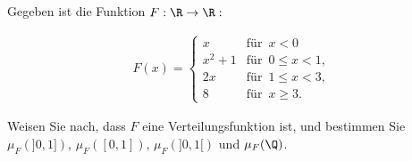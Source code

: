 \begin{exercise}

Gegeben ist die Funktion $F: \R \to \R:$

\begin{align*}
  F(x) =
  \begin{cases}
    x       & \text{für} \enspace x < 0 \\
    x^2 + 1 & \text{für} \enspace 0 \leq x < 1, \\
    2x      & \text{für} \enspace 1 \leq x < 3, \\
    8       & \text{für} \enspace x \geq 3.
  \end{cases}
\end{align*}

Weisen Sie nach, dass $F$ eine Verteilungsfunktion ist, und bestimmen Sie $\mu_F(]0, 1])$, $\mu_F([0, 1])$, $\mu_F(]0, 1[)$ und $\mu_F(\Q)$.

\end{exercise}


